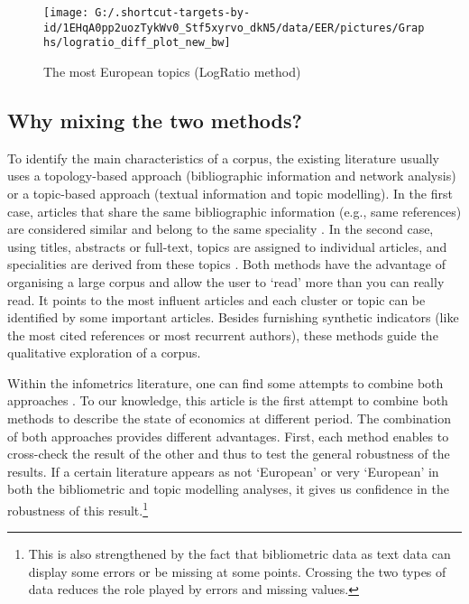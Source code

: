 \documentclass[]{elsarticle} %
\begin{document}
\begin{figure}[h]

{\centering \texttt{[image: G:/.shortcut-targets-by-id/1EHqA0pp2uozTykWv0\_Stf5xyrvo\_dkN5/data/EER/pictures/Graphs/logratio\_diff\_plot\_new\_bw]} 

}

\caption{The most European topics (LogRatio method)}\label{fig:plot-topic-diff}
\end{figure}

\hypertarget{why-mixing-the-two-methods}{%
\subsection{Why mixing the two
methods?}\label{why-mixing-the-two-methods}}

To identify the main characteristics of a corpus, the existing
literature usually uses a topology-based approach (bibliographic
information and network analysis) or a topic-based approach (textual
information and topic modelling). In the first case, articles that share
the same bibliographic information (e.g., same references) are
considered similar and belong to the same speciality
\citep{claveau2016}. In the second case, using titles, abstracts or
full-text, topics are assigned to individual articles, and specialities
are derived from these topics \citep{ambrosino2018}. Both methods have
the advantage of organising a large corpus and allow the user to `read'
more than you can really read. It points to the most influent articles
and each cluster or topic can be identified by some important articles.
Besides furnishing synthetic indicators (like the most cited references
or most recurrent authors), these methods guide the qualitative
exploration of a corpus.

Within the infometrics literature, one can find some attempts to combine
both approaches
\citep{dingCommunity2011, liAdding2012, yanTopics2012, maoTopic2017}. To
our knowledge, this article is the first attempt to combine both methods
to describe the state of economics at different period. The combination
of both approaches provides different advantages. First, each method
enables to cross-check the result of the other and thus to test the
general robustness of the results. If a certain literature appears as
not `European' or very `European' in both the bibliometric and topic
modelling analyses, it gives us confidence in the robustness of this
result.\footnote{This is also strengthened by the fact that bibliometric
  data as text data can display some errors or be missing at some
  points. Crossing the two types of data reduces the role played by
  errors and missing values.}
\end{document}
